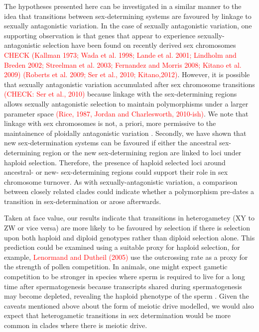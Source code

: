 \documentclass[12pt]{article}
\begin{document}
The hypotheses presented here can be investigated in a similar manner to the idea that transitions between sex-determining systems are favoured by linkage to sexually antagonistic variation. 
In the case of sexually antagonistic variation, one supporting observation is that genes that appear to experience sexually-antagonistic selection have been found on recently derived sex chromosomes \textcolor{red}{CHECK (Kallman 1973; Wada et al. 1998; Lande et al. 2001; Lindholm and Breden 2002; Streelman et al. 2003; Fernandez and Morris 2008; Kitano et al. 2009)} \textcolor{red}{(Roberts et al. 2009; Ser et al., 2010; Kitano,2012)}.
However, it is possible that sexually antagonistic variation accumulated after sex chromosome transitions \textcolor{red}{(CHECK: Ser et al., 2010)} because linkage with the sex-determining regions allows sexually antagonistic selection to maintain polymorphisms under a larger parameter space \textcolor{red}{(Rice, 1987, Jordan and Charlesworth, 2010-ish)}.
We note that linkage with sex chromosomes is not, a priori, more permissive to the maintainence of ploidally antagonistic variation \citep{Immler:2012tl}.
Secondly, we have shown that new sex-determination systems can be favoured if either the ancestral sex-determining region or the new sex-determining region are linked to loci under haploid selection. 
Therefore, the presence of haploid selected loci around ancestral- or new- sex-determining regions could support their role in sex chromosome turnover. 
As with sexually-antagonistic variation, a comparison between closely related clades could indicate whether a polymorphism pre-dates a transition in sex-determination or arose afterwards. 

Taken at face value, our results indicate that transitions in heterogametey (XY to ZW or vice versa) are more likely to be favoured by selection if there is selection upon both haploid and diploid genotypes rather than diploid selection alone. 
This prediction could be examined using a suitable proxy for haploid selection, for example, \textcolor{red}{Lenormand and Dutheil (2005)} use the outcrossing rate as a proxy for the strength of pollen competition. 
In animals, one might expect gametic competition to be stronger in species where sperm is required to live for a long time after spermatogenesis because transcripts shared during spermatogenesis may become depleted, revealing the haploid phenotype of the sperm \citep{Immler:2014im}. 
Given the caveats mentioned above about the form of meiotic drive modelled, we would also expect that heterogametic transitions in sex determination would be more common in clades where there is meiotic drive. 
\end{document}
